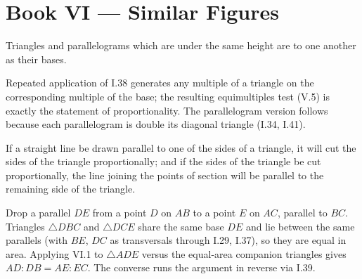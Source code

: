 %
%

\section{Book VI --- Similar Figures}
\label{sec:book-VI}

\begin{claim}
\label{prop:VI.1}
Triangles and parallelograms which are under the same height are to
one another as their bases.
\end{claim}
\begin{evidence}[Proof of VI.1]
\label{ev:VI.1}
Repeated application of I.38 generates any multiple of a triangle on
the corresponding multiple of the base; the resulting equimultiples
test (V.5) is exactly the statement of proportionality.  The
parallelogram version follows because each parallelogram is double
its diagonal triangle (I.34, I.41).
\end{evidence}

\begin{claim}
\label{prop:VI.2}
If a straight line be drawn parallel to one of the sides of a
triangle, it will cut the sides of the triangle proportionally; and
if the sides of the triangle be cut proportionally, the line joining
the points of section will be parallel to the remaining side of the
triangle.
\end{claim}
\begin{evidence}[Proof of VI.2]
\label{ev:VI.2}
Drop a parallel $DE$ from a point $D$ on $AB$ to a point $E$ on $AC$,
parallel to $BC$.  Triangles $\triangle DBC$ and $\triangle DCE$
share the same base $DE$ and lie between the same parallels (with
$BE$, $DC$ as transversals through I.29, I.37), so they are equal in
area.  Applying VI.1 to $\triangle ADE$ versus the equal-area
companion triangles gives $AD : DB = AE : EC$.  The converse runs the
argument in reverse via I.39.
\end{evidence}

